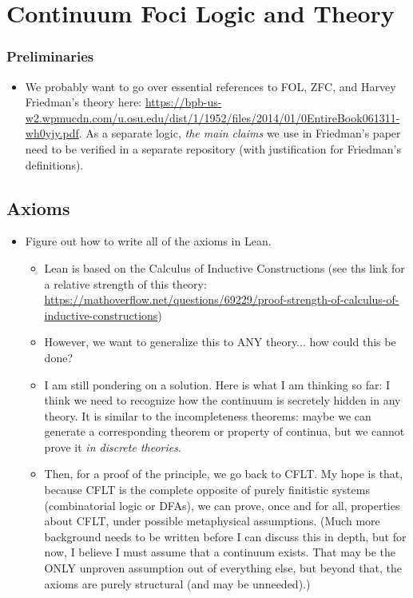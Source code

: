 
\chapter{Continuum Foci Logic and Theory}
\label{ch:cflt}

\subsection{Preliminaries}
\begin{itemize}
  \item We probably want to go over essential references to FOL, ZFC, and Harvey Friedman's theory here: \url{https://bpb-us-w2.wpmucdn.com/u.osu.edu/dist/1/1952/files/2014/01/0EntireBook061311-wh0yjy.pdf}.
  As a separate logic, \textit{the main claims} we use in Friedman's paper need to be verified in a separate repository (with justification for Friedman's definitions).
\end{itemize}


\section{Axioms}
\begin{itemize}
  \item Figure out how to write all of the axioms in Lean.
    \begin{itemize}
      \item Lean is based on the Calculus of Inductive Constructions (see ths link for a relative strength of this theory: \url{https://mathoverflow.net/questions/69229/proof-strength-of-calculus-of-inductive-constructions})
      \item However, we want to generalize this to ANY theory... how could this be done?
      \item I am still pondering on a solution. Here is what I am thinking so far: I think we need to recognize how the continuum is secretely hidden in any theory. It is similar to the incompleteness theorems: maybe we can generate a corresponding theorem or property of continua, but we cannot prove it \textit{in discrete theories}.
      \item Then, for a proof of the principle, we go back to CFLT. My hope is that, because CFLT is the complete opposite of purely finitistic systems (combinatorial logic or DFAs), we can prove, once and for all, properties about CFLT, under possible metaphysical assumptions. (Much more background needs to be written before I can discuss this in depth, but for now, I believe I must assume that a continuum exists. That may be the ONLY unproven assumption out of everything else, but beyond that, the axioms are purely structural (and may be unneeded).)

  \end{itemize}
\end{itemize}

